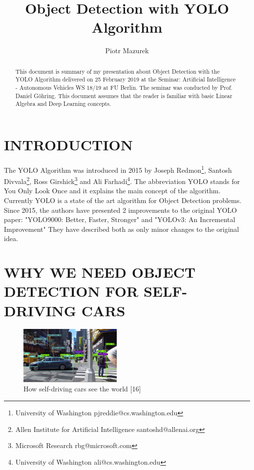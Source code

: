 \documentclass[letterpaper, 10 pt, conference]{ieeeconf}  %
\title{\LARGE \bf
Object Detection with YOLO Algorithm}
\author{Piotr Mazurek}
\begin{document}
\maketitle
\thispagestyle{empty}
\pagestyle{empty}


\begin{abstract}

This document is summary of my presentation about Object Detection with the YOLO Algorithm delivered on 25 February 2019 at the Seminar: Artificial Intelligence - Autonomous Vehicles WS 18/19 at FU Berlin. The seminar was conducted by Prof. Daniel G{\"o}hring. This document assumes that the reader is familiar with basic Linear Algebra and Deep Learning concepts.

\end{abstract}


\section{INTRODUCTION}

The YOLO Algorithm was introduced in 2015 by Joseph Redmon\footnote{University of Washington pjreddie@cs.washington.edu}, Santosh Divvala\footnote{Allen Institute for Artificial Intelligence santoshd@allenai.org}, Ross Girshick\footnote{Microsoft Research rbg@microsoft.com} and Ali Farhadi\footnote{University of Washington ali@cs.washington.edu}. The abbreviation YOLO stands for You Only Look Once and it explains the main concept of the algorithm. Currently YOLO is a state of the art algorithm for Object Detection problems. Since 2015, the authors have presented 2 improvements to the original YOLO paper: "YOLO9000: Better, Faster, Stronger" and "YOLOv3: An Incremental Improvement" They have described both as only minor changes to the original idea.

\section{WHY WE NEED OBJECT DETECTION FOR SELF-DRIVING CARS}
\begin{figure}[ht]
	\centering
    \includegraphics[width=0.45\textwidth]{Pictures/self_drive_see.png}
	\caption{How self-driving cars see the world [16]}
\end{figure}
\end{document}
